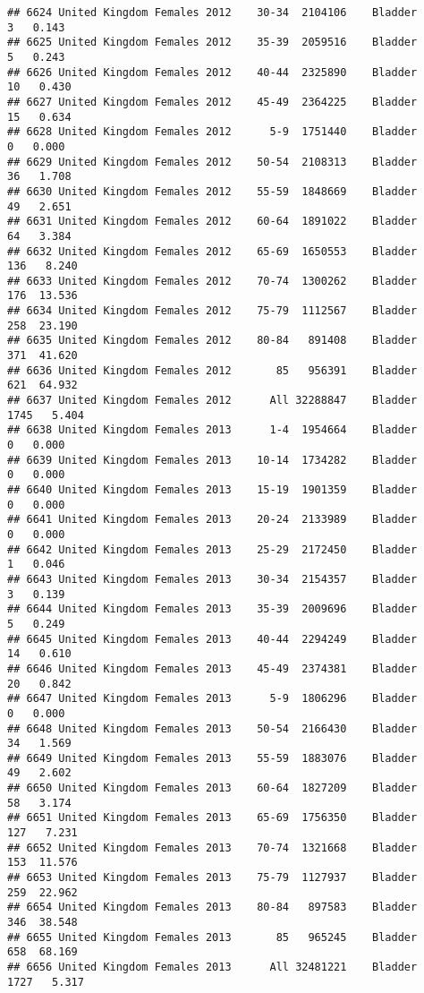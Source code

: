 \documentclass[
]{article}
\begin{document}
\begin{verbatim}
## 6624 United Kingdom Females 2012    30-34  2104106    Bladder      3   0.143
## 6625 United Kingdom Females 2012    35-39  2059516    Bladder      5   0.243
## 6626 United Kingdom Females 2012    40-44  2325890    Bladder     10   0.430
## 6627 United Kingdom Females 2012    45-49  2364225    Bladder     15   0.634
## 6628 United Kingdom Females 2012      5-9  1751440    Bladder      0   0.000
## 6629 United Kingdom Females 2012    50-54  2108313    Bladder     36   1.708
## 6630 United Kingdom Females 2012    55-59  1848669    Bladder     49   2.651
## 6631 United Kingdom Females 2012    60-64  1891022    Bladder     64   3.384
## 6632 United Kingdom Females 2012    65-69  1650553    Bladder    136   8.240
## 6633 United Kingdom Females 2012    70-74  1300262    Bladder    176  13.536
## 6634 United Kingdom Females 2012    75-79  1112567    Bladder    258  23.190
## 6635 United Kingdom Females 2012    80-84   891408    Bladder    371  41.620
## 6636 United Kingdom Females 2012       85   956391    Bladder    621  64.932
## 6637 United Kingdom Females 2012      All 32288847    Bladder   1745   5.404
## 6638 United Kingdom Females 2013      1-4  1954664    Bladder      0   0.000
## 6639 United Kingdom Females 2013    10-14  1734282    Bladder      0   0.000
## 6640 United Kingdom Females 2013    15-19  1901359    Bladder      0   0.000
## 6641 United Kingdom Females 2013    20-24  2133989    Bladder      0   0.000
## 6642 United Kingdom Females 2013    25-29  2172450    Bladder      1   0.046
## 6643 United Kingdom Females 2013    30-34  2154357    Bladder      3   0.139
## 6644 United Kingdom Females 2013    35-39  2009696    Bladder      5   0.249
## 6645 United Kingdom Females 2013    40-44  2294249    Bladder     14   0.610
## 6646 United Kingdom Females 2013    45-49  2374381    Bladder     20   0.842
## 6647 United Kingdom Females 2013      5-9  1806296    Bladder      0   0.000
## 6648 United Kingdom Females 2013    50-54  2166430    Bladder     34   1.569
## 6649 United Kingdom Females 2013    55-59  1883076    Bladder     49   2.602
## 6650 United Kingdom Females 2013    60-64  1827209    Bladder     58   3.174
## 6651 United Kingdom Females 2013    65-69  1756350    Bladder    127   7.231
## 6652 United Kingdom Females 2013    70-74  1321668    Bladder    153  11.576
## 6653 United Kingdom Females 2013    75-79  1127937    Bladder    259  22.962
## 6654 United Kingdom Females 2013    80-84   897583    Bladder    346  38.548
## 6655 United Kingdom Females 2013       85   965245    Bladder    658  68.169
## 6656 United Kingdom Females 2013      All 32481221    Bladder   1727   5.317

\end{verbatim}
\end{document}
